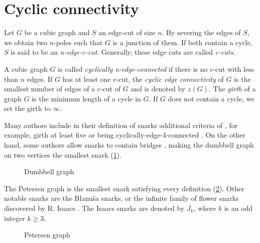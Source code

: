 \section{Cyclic connectivity}\label{sec:snarks}


Let $G$ be a cubic graph and $S$ an edge-cut of size $n$. By severing the edges of $S$, we obtain two $n$-poles such that $G$ is a junction of them. If both contain a cycle, $S$ is said to be an \textit{n-edge-c-cut}. Generally, these edge cuts are called \textit{c-cuts}. 

A cubic graph $G$ is called \textit{cyclically n-edge-connected} if there is no c-cut with less than $n$ edges.
If $G$ has at least one c-cut, the \textit{cyclic edge connectivity} of $G$ is the smallest number of edges of a c-cut of $G$ and is denoted by $z(G)$.
The \textit{girth} of a graph $G$ is the minimum length of a cycle in $G$. If $G$ does not contain a cycle, we set the girth to $\infty$.

Many authors include in their definition of snarks additional criteria of , for example, girth at least five or being cyclically-edge-4-connected \cite{Preissmann1983, Nedela1996}. On the other hand, some authors allow snarks to contain bridges \cite{IrreducibleSnarksSkoviera}, making the dumbbell graph on two vertices the smallest snark (\cref{fig:dumbbell}).

\begin{figure}
	\centering
	
	\caption{Dumbbell graph}
	\label{fig:dumbbell}
\end{figure}

The Petersen graph is the smallest snark satisfying every definition (\cref{fig:petersen}). Other notable snarks are the Blanuša snarks, or the infinite family of flower snarks discovered by R. Isaacs \cite{Isaacs1975}. The Isaacs snarks are denoted by $J_k$, where $k$ is an odd integer $k\geq 3$.

\begin{figure}
	\centering
	
	\caption{Petersen graph}
	\label{fig:petersen}
\end{figure}